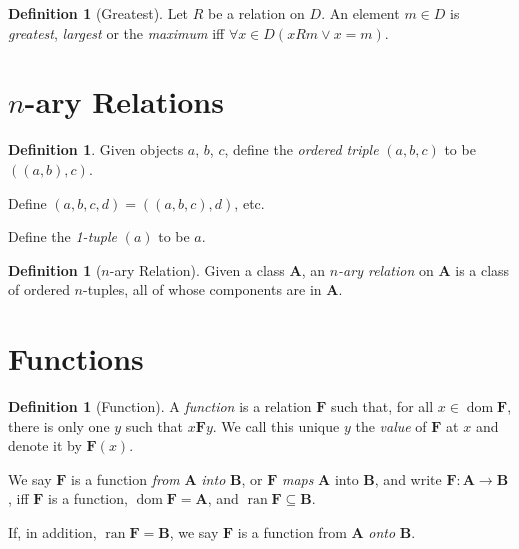 \documentclass{report}
\theoremstyle{definition}
\newtheorem{definition}[axiom]{Definition}
\newcommand{\dom}{\ensuremath{\operatorname{dom}}}
\newcommand{\ran}{\ensuremath{\operatorname{ran}}}
\begin{document}
    \begin{definition}[Greatest]
        Let $R$ be a relation on $D$. An element $m \in D$ is \emph{greatest}, \emph{largest} or the
        \emph{maximum} iff $\forall x \in D (xRm \vee x = m)$.
    \end{definition}


    \section{$n$-ary Relations}

    \begin{definition}
        Given objects $a$, $b$, $c$, define the \emph{ordered triple}
        $(a,b,c)$ to be $((a,b),c)$.

        Define $(a,b,c,d) = ((a,b,c),d)$, etc.

        Define the \emph{1-tuple} $(a)$ to be $a$.
    \end{definition}

    \begin{definition}[$n$-ary Relation]
        Given a class $\mathbf{A}$, an \emph{$n$-ary relation} on $\mathbf{A}$ is a class of ordered
        $n$-tuples, all of whose components are in $\mathbf{A}$.
    \end{definition}

    \section{Functions}

    \begin{definition}[Function]
        A \emph{function} is a relation $\mathbf{F}$ such that, for all $x \in \dom \mathbf{F}$,
        there is only one $y$ such that $x \mathbf{F} y$. We call this unique $y$ the \emph{value}
        of $\mathbf{F}$ at $x$ and denote it by $\mathbf{F}(x)$.

        We say $\mathbf{F}$ is a function \emph{from} $\mathbf{A}$ \emph{into} $\mathbf{B}$,
        or $\mathbf{F}$ \emph{maps} $\mathbf{A}$ into $\mathbf{B}$, and write $\mathbf{F} : \mathbf{A}
        \rightarrow \mathbf{B}$, iff $\mathbf{F}$ is a function, $\dom \mathbf{F} = \mathbf{A}$,
        and $\ran \mathbf{F} \subseteq \mathbf{B}$.

        If, in addition, $\ran \mathbf{F} = \mathbf{B}$, we say $\mathbf{F}$ is a function from $\mathbf{A}$
        \emph{onto} $\mathbf{B}$.
    \end{definition}
\end{document}

